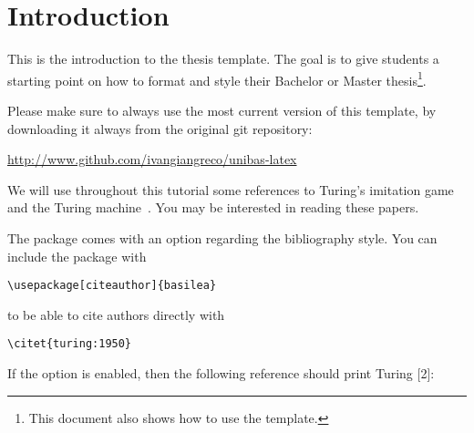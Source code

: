 \chapter{Introduction}


This is the introduction to the thesis template. The goal is to give students a starting point on how to format and style their Bachelor or Master thesis\footnote{This document also shows how to use the template.}. 

Please make sure to always use the most current version of this template, by downloading it always from the original git repository:
\begin{center}
	\url{http://www.github.com/ivangiangreco/unibas-latex} 
\end{center}

We will use throughout this tutorial some references to Turing's imitation game~\cite{turing:1950} and the Turing machine~\cite{turing:1936}. You may be interested in reading these papers.

\vspace{1em}
The package comes with an option regarding the bibliography style.
You can include the package with
\begin{verbatim}
\usepackage[citeauthor]{basilea}
\end{verbatim}
to be able to cite authors directly with
\begin{verbatim}
\citet{turing:1950}
\end{verbatim}

If the option is enabled, then the following reference should print Turing [2]:~\citet{turing:1950}

